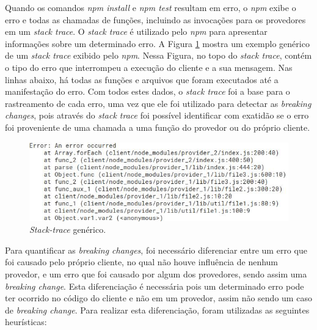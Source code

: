 Quando os comandos \textit{npm install} e \textit{npm test} resultam em erro, o \textit{npm} exibe o erro e todas as chamadas de funções, incluindo as invocações para os provedores em um \textit{stack trace}. O \textit{stack trace} é utilizado pelo \textit{npm} para apresentar informações sobre um determinado erro. A Figura \ref{fig:trace} mostra um exemplo genérico de um \textit{stack trace} exibido pelo \textit{npm}. Nessa Figura, no topo do \textit{stack trace}, contém o tipo do erro que interrompeu a execução do cliente e a sua mensagem. Nas linhas abaixo, há todas as funções e arquivos que foram executados até a manifestação do erro. Com todos estes dados, o \textit{stack trace} foi a base para o rastreamento de cada erro, uma vez que ele foi utilizado para detectar as \textit{breaking changes}, pois através do \textit{stack trace} foi possível identificar com exatidão se o erro foi proveniente de uma chamada a uma função do provedor ou do próprio cliente.

\begin{figure}
    \centering
    \includegraphics[scale=0.7]{figuras/stack_trace.jpeg}
    \caption{\textit{Stack-trace} genérico.}
    \label{fig:trace}
\end{figure}{}

Para quantificar as \textit{breaking changes}, foi necessário diferenciar entre um erro que foi causado pelo próprio cliente, no qual não houve influência de nenhum provedor, e um erro que foi causado por algum dos provedores, sendo assim uma \textit{breaking change}. Esta diferenciação é necessária pois um determinado erro pode ter ocorrido no código do cliente e não em um provedor, assim não sendo um caso de \textit{breaking change}. Para realizar esta diferenciação, foram utilizadas as seguintes heurísticas:

